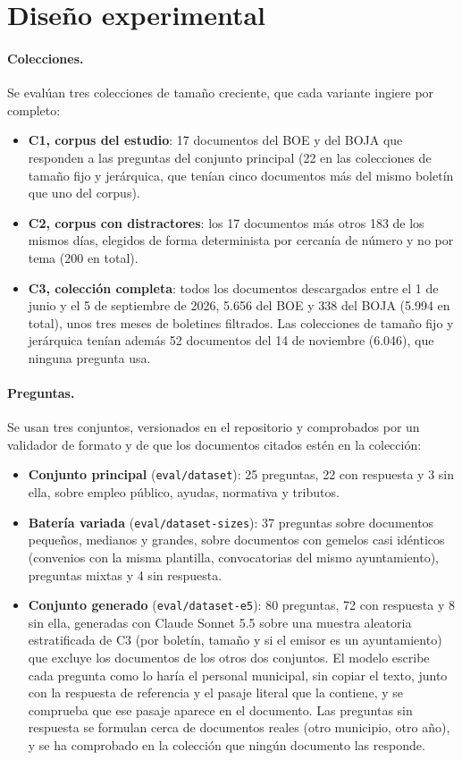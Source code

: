 \section{Diseño experimental}
\label{sec:diseno-experimental}

\paragraph{Colecciones.} Se evalúan tres colecciones de tamaño creciente, que cada variante ingiere por completo:

\begin{itemize}
  \item \textbf{C1, corpus del estudio}: 17 documentos del BOE y del BOJA que responden a las preguntas del conjunto principal (22 en las colecciones de tamaño fijo y jerárquica, que tenían cinco documentos más del mismo boletín que uno del corpus).
  \item \textbf{C2, corpus con distractores}: los 17 documentos más otros 183 de los mismos días, elegidos de forma determinista por cercanía de número y no por tema (200 en total).
  \item \textbf{C3, colección completa}: todos los documentos descargados entre el 1 de junio y el 5 de septiembre de 2026, 5.656 del BOE y 338 del BOJA (5.994 en total), unos tres meses de boletines filtrados. Las colecciones de tamaño fijo y jerárquica tenían además 52 documentos del 14 de noviembre (6.046), que ninguna pregunta usa.
\end{itemize}

\paragraph{Preguntas.} Se usan tres conjuntos, versionados en el repositorio y comprobados por un validador de formato y de que los documentos citados estén en la colección:

\begin{itemize}
  \item \textbf{Conjunto principal} (\texttt{eval/dataset}): 25 preguntas, 22 con respuesta y 3 sin ella, sobre empleo público, ayudas, normativa y tributos.
  \item \textbf{Batería variada} (\texttt{eval/dataset-sizes}): 37 preguntas sobre documentos pequeños, medianos y grandes, sobre documentos con gemelos casi idénticos (convenios con la misma plantilla, convocatorias del mismo ayuntamiento), preguntas mixtas y 4 sin respuesta.
  \item \textbf{Conjunto generado} (\texttt{eval/dataset-e5}): 80 preguntas, 72 con respuesta y 8 sin ella, generadas con Claude Sonnet 5.5 sobre una muestra aleatoria estratificada de C3 (por boletín, tamaño y si el emisor es un ayuntamiento) que excluye los documentos de los otros dos conjuntos. El modelo escribe cada pregunta como lo haría el personal municipal, sin copiar el texto, junto con la respuesta de referencia y el pasaje literal que la contiene, y se comprueba que ese pasaje aparece en el documento. Las preguntas sin respuesta se formulan cerca de documentos reales (otro municipio, otro año), y se ha comprobado en la colección que ningún documento las responde.
\end{itemize}

